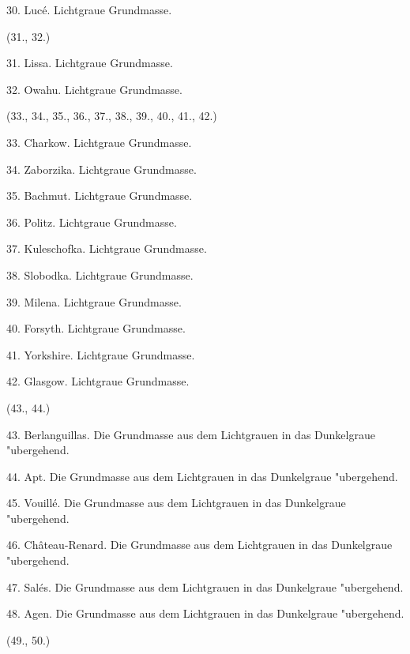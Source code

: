 \documentclass[a4paper, 11pt, oneside, polutonikogreek, german]{article}
\begin{document}
\vspace{2ex}

30. Lucé. Lichtgraue Grundmasse.

\vspace{2ex}

\begin{center}
(31., 32.)
\end{center}

31. Lissa. Lichtgraue Grundmasse.

32. Owahu. Lichtgraue Grundmasse.

\begin{center}
(33., 34., 35., 36., 37., 38., 39., 40., 41., 42.)
\end{center}

33. Charkow. Lichtgraue Grundmasse.

34. Zaborzika. Lichtgraue Grundmasse.

35. Bachmut. Lichtgraue Grundmasse.

36. Politz. Lichtgraue Grundmasse.

37. Kuleschofka. Lichtgraue Grundmasse.

38. Slobodka. Lichtgraue Grundmasse.

39. Milena. Lichtgraue Grundmasse.

40. Forsyth. Lichtgraue Grundmasse.

41. Yorkshire. Lichtgraue Grundmasse.

42. Glasgow. Lichtgraue Grundmasse.

\begin{center}
(43., 44.)
\end{center}

43. Berlanguillas. Die Grundmasse aus dem Lichtgrauen in das Dunkelgraue "ubergehend.

44. Apt. Die Grundmasse aus dem Lichtgrauen in das Dunkelgraue "ubergehend.

\vspace{2ex}

45. Vouillé. Die Grundmasse aus dem Lichtgrauen in das Dunkelgraue "ubergehend.

46. Château-Renard. Die Grundmasse aus dem Lichtgrauen in das Dunkelgraue "ubergehend.

47. Salés. Die Grundmasse aus dem Lichtgrauen in das Dunkelgraue "ubergehend.

48. Agen. Die Grundmasse aus dem Lichtgrauen in das Dunkelgraue "ubergehend.

\begin{center}
(49., 50.)
\end{center}
\end{document}
